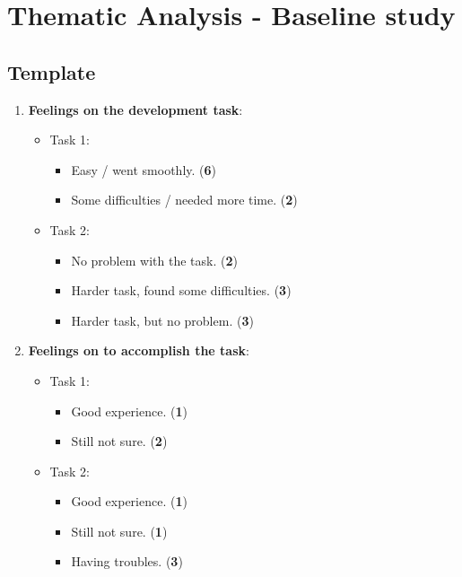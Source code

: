 \chapter{Thematic Analysis - Baseline study}

\section{Template}
\begin{enumerate}
    \item \textbf{Feelings on the development task}:
    \begin{itemize}
        \item Task 1:
        \begin{itemize}
            \item Easy / went smoothly. (\textbf{6})
            \item Some difficulties / needed more time. (\textbf{2})
        \end{itemize}

        \item Task 2:
        \begin{itemize}
            \item No problem with the task. (\textbf{2})
            \item Harder task, found some difficulties. (\textbf{3})
            \item Harder task, but no problem. (\textbf{3})
        \end{itemize}
    \end{itemize}

    \item \textbf{Feelings on \tdd to accomplish the task}:
    \begin{itemize}
        \item Task 1:
        \begin{itemize}
            \item Good experience. (\textbf{1})
            \item Still not sure. (\textbf{2})
        \end{itemize}

        \item Task 2:
        \begin{itemize}
            \item Good experience. (\textbf{1})
            \item Still not sure. (\textbf{1})
            \item Having troubles. (\textbf{3})
        \end{itemize}
    \end{itemize}
    

\end{enumerate}
